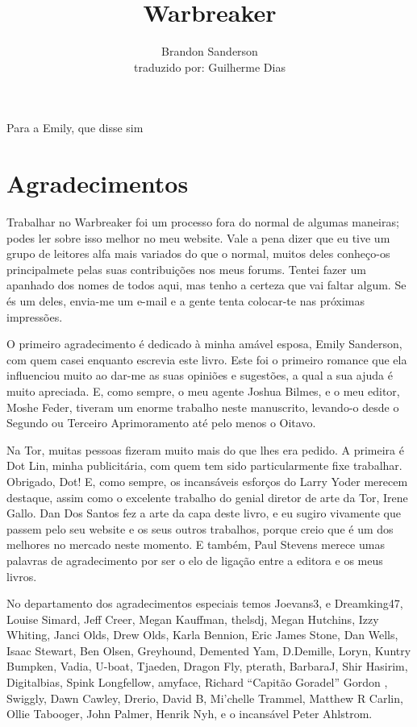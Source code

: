 \documentclass[11pt,a4paper]{book}
\author{Brandon Sanderson \\ traduzido por: Guilherme Dias}
\title{Warbreaker}
\begin{document}
\maketitle
\newpage
Para a Emily, que disse sim
\tableofcontents
\chapter{Agradecimentos}
Trabalhar no Warbreaker foi um processo fora do normal de algumas maneiras; podes ler sobre isso melhor no meu website. Vale a pena dizer que eu tive um grupo de leitores alfa mais variados do que o normal, muitos deles conheço-os principalmete pelas suas contribuições nos meus forums. Tentei fazer um apanhado dos nomes de todos aqui, mas tenho a certeza que vai faltar algum. Se és um deles, envia-me um e-mail e a gente tenta colocar-te nas próximas impressões.

O primeiro agradecimento é dedicado à minha amável esposa, Emily Sanderson, com quem casei enquanto escrevia este livro. Este foi o primeiro romance que ela influenciou muito ao dar-me as suas opiniões e sugestões, a qual a sua ajuda é muito apreciada. E, como sempre, o meu agente Joshua Bilmes, e o meu editor, Moshe Feder, tiveram um enorme trabalho neste manuscrito, levando-o desde o Segundo ou Terceiro Aprimoramento até pelo menos o Oitavo.

Na Tor, muitas pessoas fizeram muito mais do que lhes era pedido. A primeira é Dot Lin, minha publicitária, com quem tem sido particularmente fixe trabalhar. Obrigado, Dot! E, como sempre, os incansáveis esforços do Larry Yoder merecem destaque, assim como o excelente trabalho do genial diretor de arte da Tor, Irene Gallo. Dan Dos Santos fez a arte da capa deste livro, e eu sugiro vivamente que passem pelo seu website e os seus outros trabalhos, porque creio que é um dos melhores no mercado neste momento. E também, Paul Stevens merece umas palavras de agradecimento por ser o elo de ligação entre a editora e os meus livros.

No departamento dos agradecimentos especiais temos Joevans3, e Dreamking47, Louise Simard, Jeff Creer, Megan Kauffman, thelsdj, Megan Hutchins, Izzy Whiting, Janci Olds, Drew Olds, Karla Bennion, Eric James Stone, Dan Wells, Isaac Stewart, Ben Olsen, Greyhound, Demented Yam, D.Demille, Loryn, Kuntry Bumpken, Vadia, U-boat, Tjaeden, Dragon Fly, pterath, BarbaraJ, Shir Hasirim, Digitalbias, Spink Longfellow, amyface, Richard “Capitão Goradel” Gordon , Swiggly, Dawn Cawley, Drerio, David B, Mi’chelle Trammel, Matthew R Carlin, Ollie Tabooger, John Palmer, Henrik Nyh, e o incansável Peter Ahlstrom.
\end{document}
